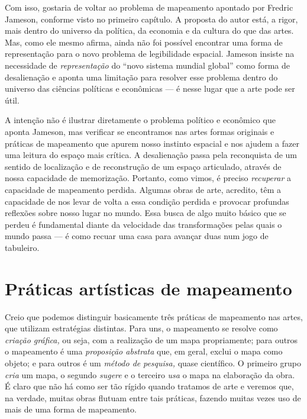 Com isso, gostaria de voltar ao problema de mapeamento apontado por
Fredric Jameson, conforme visto no primeiro capítulo. A proposta do
autor está, a rigor, mais dentro do universo da política, da economia e
da cultura do que das artes. Mas, como ele mesmo afirma, ainda não foi
possível encontrar uma forma de representação para o novo problema de
legibilidade espacial. Jameson insiste na necessidade de
\emph{representação} do ``novo sistema mundial global'' como forma de
desalienação e aponta uma limitação para resolver esse problema dentro
do universo das ciências políticas e econômicas --- é nesse lugar que a
arte pode ser útil.

A intenção não é ilustrar diretamente o problema político e econômico
que aponta Jameson, mas verificar se encontramos nas artes formas
originais e práticas de mapeamento que apurem nosso instinto espacial e
nos ajudem a fazer uma leitura do espaço mais crítica. A desalienação
passa pela reconquista de um sentido de localização e de reconstrução de
um espaço articulado, através de nossa capacidade de memorização.
Portanto, como vimos, é preciso \emph{recuperar} a capacidade de
mapeamento perdida. Algumas obras de arte, acredito, têm a capacidade de
nos levar de volta a essa condição perdida e provocar profundas
reflexões sobre nosso lugar no mundo. Essa busca de algo muito básico
que se perdeu é fundamental diante da velocidade das transformações
pelas quais o mundo passa --- é como recuar uma casa para avançar duas
num jogo de tabuleiro.

\chapter{Práticas artísticas de mapeamento}

Creio que podemos distinguir basicamente três práticas de mapeamento nas
artes, que utilizam estratégias distintas. Para uns, o mapeamento se
resolve como \emph{criação gráfica,} ou seja, com a realização de um
mapa propriamente; para outros o mapeamento é uma \emph{proposição
abstrata} que, em geral, exclui o mapa como objeto; e para outros é um
\emph{método de} \emph{pesquisa,} quase científico. O primeiro grupo
\emph{cria} um mapa, o segundo \emph{sugere} e o terceiro \emph{usa} o
mapa na elaboração da obra. É claro que não há como ser tão rígido
quando tratamos de arte e veremos que, na verdade, muitas obras flutuam
entre tais práticas, fazendo muitas vezes uso de mais de uma forma de
mapeamento.

